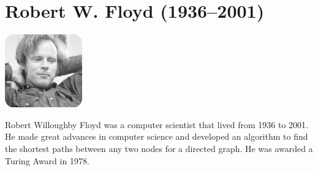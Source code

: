 \documentclass{article}
\begin{document}
\section{Robert W. Floyd (1936–2001)}
\begin{center}
\includegraphics[width=0.25\textwidth]{floyd.jpg}
\end{center}
Robert Willoughby Floyd was a computer scientist that lived from 1936 to 2001. He made great advances in computer science and developed an algorithm to find the shortest paths between any two nodes for a directed graph. He was awarded a Turing Award in 1978.
\end{document}
